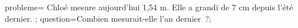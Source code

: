 \documentclass[exercice]{thedocument}%
\begin{document}
%
    \>probleme={%
        Chloé mesure aujourd'hui 1,54 m. Elle a grandi de 7 cm depuis l'été
        dernier.%
    };%
    \>question=Combien mesurait-elle l'an dernier~?;%
\end{document}
